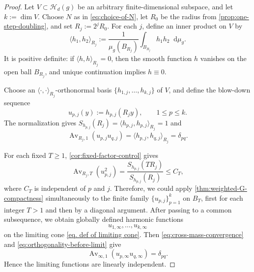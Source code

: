 \documentclass[12pt]{amsart}
\theoremstyle{plain}
\theoremstyle{definition}
\theoremstyle{remark}     %
\numberwithin{equation}{section}
\newcommand{\dd}{\mathop{}\!\mathrm{d}}%
\begin{document}
\begin{proof}
Let $V\subset\mathcal H_d(g)$ be an arbitrary finite-dimensional subspace,
and let $k:=\dim V.$
Choose $N$ as in \cref{eq:choice-of-N}, let $R_0$ be the
radius from \cref{prop:one-step-doubling}, and set $R_j:=2^jR_0.$
For each $j$, define an inner product on $V$ by
\[
    \langle h_1,h_2\rangle_{R_j}
    :=\frac{1}{\mu_g(B_{R_j})}
      \int_{B_{R_j}}h_1h_2\dd\mu_g.
\]
It is positive definite: if $\langle h,h\rangle_{R_j}=0$, then the smooth
function $h$ vanishes on the open ball $B_{R_j}$, and unique continuation
implies $h\equiv0$.

Choose an $\langle\cdot,\cdot\rangle_{R_j}$-orthonormal basis
$ \{h_{1,j},\ldots,h_{k,j}\}$ of $V$, 
and define the blow-down sequence
\[
    u_{p,j}(y):=h_{p,j}(R_jy),
    \qquad 1\leq p\leq k.
\]
The normalization gives $S_{h_{p,j}}(R_j)=\langle h_{p,j},h_{p,j}\rangle_{R_j}=1$ and
\begin{equation}\label{eq:orthogonality-before-limit}
    \operatorname{Av}_{R_j,1}(u_{p,j}u_{q,j})
    =\langle h_{p,j},h_{q,j}\rangle_{R_j}
    =\delta_{pq}.
\end{equation}

For each fixed $T\geq1$, \cref{cor:fixed-factor-control} gives
\[
    \operatorname{Av}_{R_j,T}(u_{p,j}^2)
    =\frac{S_{h_{p,j}}(TR_j)}{S_{h_{p,j}}(R_j)}
    \leq C_T,
\]
where $C_T$ is independent of $p$ and $j$.  Therefore, we could apply
\cref{thm:weighted-G-compactness} simultaneously to the finite
family $\{u_{p,j}\}_{p=1}^k$ on $B_T$, first for each integer
$T>1$ and then by a diagonal argument.  After passing to a common
subsequence, we obtain globally defined harmonic functions
\[
    u_{1,\infty},\ldots,u_{k,\infty}
\]
on the limiting cone \cref{eq. def of limiting cone}.  Then \cref{eq:cross-mass-convergence} and \cref{eq:orthogonality-before-limit} give
\[
    \operatorname{Av}_{\infty,1}
    (u_{p,\infty}u_{q,\infty})
    =\delta_{pq}.
\]
Hence the limiting functions are linearly independent.


\end{proof}
\end{document}
